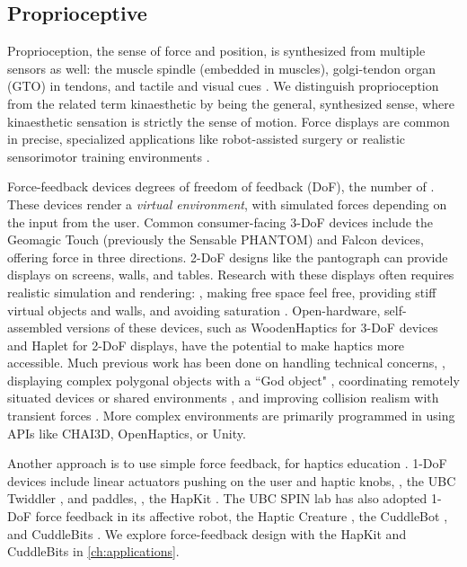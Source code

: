 \subsection{Proprioceptive }
Proprioception, the sense of force and position, is synthesized from multiple sensors as well: the muscle spindle (embedded in muscles), golgi-tendon organ (GTO) in tendons, and tactile and visual cues \cite{Kandel2000}.
We distinguish proprioception from the related term kinaesthetic by being the general, synthesized sense, where kinaesthetic sensation is strictly the sense of motion.
Force displays are common in precise, specialized applications like robot-assisted surgery \cite{Okamura2009} or realistic sensorimotor training environments \cite{VanDerMeijden2009}.

Force-feedback devices  degrees of freedom of feedback (DoF), the number of .
These devices render a \emph{virtual environment}, with simulated forces depending on the input from the user.
Common consumer-facing 3-DoF devices include the Geomagic Touch (previously the Sensable PHANTOM) and Falcon devices, offering force in three directions.
2-DoF designs like the pantograph \cite{Ramstein1994,Campion2005} can provide displays on screens, walls, and tables.
Research with these displays often requires realistic simulation and rendering: \eg, making free space feel free, providing stiff virtual objects and walls, and avoiding saturation  \cite{massie1994phantom}.
Open-hardware, self-assembled versions of these devices, such as WoodenHaptics \cite{Forsslund2015} for 3-DoF devices and Haplet \cite{Gallacher2016} for 2-DoF displays, have the potential to make haptics more accessible.
Much previous work has been done on handling technical concerns, \eg, displaying complex polygonal objects with a ``God object" \cite{Zilles1995}, coordinating remotely situated devices or shared environments \cite{Buttolo1997}, and improving collision realism with transient forces \cite{Kuchenbecker2006}.
More complex environments are primarily programmed in using APIs like CHAI3D, OpenHaptics, or Unity.

Another approach is to use simple force feedback,  for haptics education \cite{Jones2014}.
1-DoF devices include linear actuators pushing on the user and haptic knobs, \eg, the UBC Twiddler \cite{Shaver2003,Enriquez2003,MacLean2009a}, and paddles, \eg, the HapKit \cite{Martinez2016}.
The UBC SPIN lab has also adopted 1-DoF force feedback in its affective robot, the Haptic Creature \cite{Yohanan2011affectdisplay,Yohanan2011affectivetouch}, the CuddleBot \cite{Allen2015cuddlebot}, and CuddleBits \cite{cang2015cuddlebits}.
We explore force-feedback design with the HapKit and CuddleBits in \autoref{ch:applications}.


